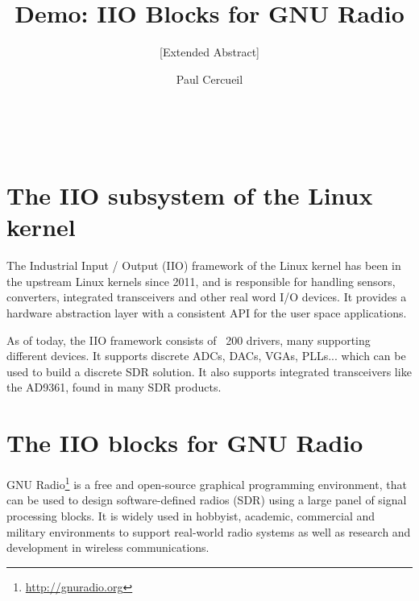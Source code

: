 \documentclass{acm_proc_article-sp}
\begin{document}
\title{Demo: IIO Blocks for GNU Radio}
\subtitle{[Extended Abstract]}


\author{
\alignauthor
Paul Cercueil\\
	\\
	\\
	\\
}

\maketitle



\section{The IIO subsystem of the Linux kernel}

The Industrial Input / Output (IIO) framework of the Linux kernel has been in
the upstream Linux kernels since 2011, and is responsible for handling sensors,
converters, integrated transceivers and other real word I/O devices. It provides
a hardware abstraction layer with a consistent API for the user space
applications.

As of today, the IIO framework consists of ~200 drivers, many supporting
different devices. It supports discrete ADCs, DACs, VGAs, PLLs... which
can be used to build a discrete SDR solution. It also supports integrated
transceivers like the AD9361, found in many SDR products.

\section{The IIO blocks for GNU Radio}

GNU Radio\footnote{ \url{http://gnuradio.org}}
is a free and open-source graphical programming environment, that can
be used to design software-defined radios (SDR) using a large panel of signal
processing blocks. It is widely used in hobbyist, academic, commercial and
military environments to support real-world radio systems as well as research
and development in wireless communications.
\end{document}
